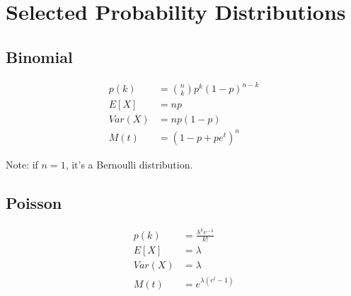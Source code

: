 \section{Selected Probability Distributions}

\begin{minipage}{.09\textwidth}
  \subsection{Binomial}

    \begin{align*}
    	p(k)&={{n}\choose{k} }p^k (1-p)^{n-k} \\
    	E[X]&=np \\
    	Var(X)&=np(1-p) \\
    	M(t)&=(1-p+pe^{t})^{n}
    \end{align*}

Note: if $n=1$, it's a Bernoulli distribution.
\end{minipage}%
\begin{minipage}{.09\textwidth}
  \subsection{Poisson}

    \begin{align*}
    	p(k)&=\frac{\lambda^ke^{-\lambda}}{k!} \\
    	E[X]&=\lambda \\
    	Var(X)&=\lambda \\
    	M(t)&=e^{\lambda(e^t-1)}
    \end{align*}
\end{minipage}

